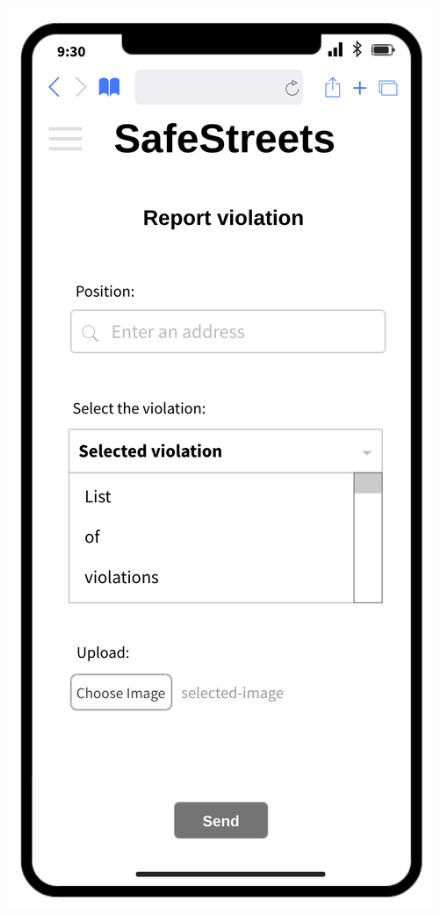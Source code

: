 \newpage
	
		\begin{figure}[H]
		\centering
		\begin{minipage}[b]{0.40\textwidth}
			\includegraphics[width=\textwidth]{Images/rasd-mocks/report.png}

\end{minipage}
\end{figure}
